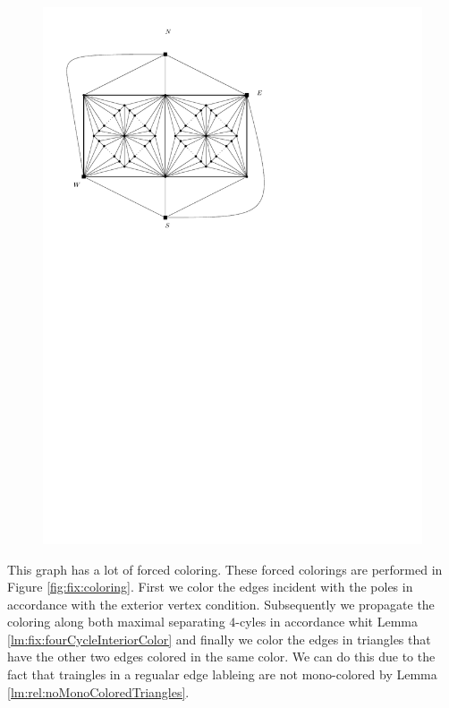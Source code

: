   \begin{figure}[h]
    \centering
    \includegraphics[scale=1]{fixExtension/img/manymanybase}
    \caption{}
    \label{fig:fix:manymany0}
  \end{figure}

  This graph has a lot of forced coloring. These forced colorings are performed in Figure \ref{fig:fix:coloring}. First we color the edges incident with the poles in accordance with the exterior vertex condition. Subsequently we propagate the coloring along both maximal separating $4$-cyles in accordance whit Lemma \ref{lm:fix:fourCycleInteriorColor} and finally we color the edges in triangles that have the other two edges colored in the same color. We can do this due to the fact that traingles in a regualar edge lableing are not mono-colored by Lemma \ref{lm:rel:noMonoColoredTriangles}.


